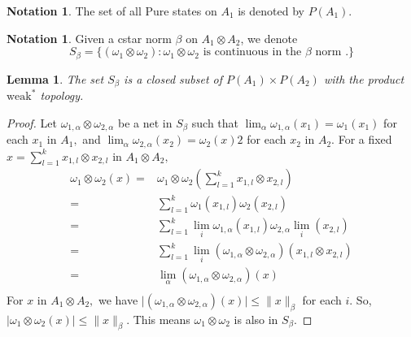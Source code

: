 \documentclass{article}
\theoremstyle{plain}
\newtheorem{lemma}[theorem]{Lemma}
\theoremstyle{definition}
\newtheorem{notation}[theorem]{Notation}
\theoremstyle{remark}
\begin{document}
\begin{notation}
	The set of all Pure states on $A_1$ is denoted by $P(A_1).$
\end{notation}

\begin{notation}
	Given a  cstar norm $\beta$ on $A_1 \otimes A_2$,
	we denote
	$$ S_ \beta = \{ ( \omega_1 \otimes \omega_2) \colon
		\omega_1 \otimes \omega_2 \text{ is continuous in the }
	\beta \text{ norm }. \} $$
\end{notation}

\begin{lemma}
	The set $S_\beta$ is a closed subset of $P(A_1) \times P(A_2)$
	with the product $\text{weak}^\ast$ topology.
\end{lemma}

\begin{proof}
	Let $\omega_{1,\alpha} \otimes \omega_{2,\alpha}$ be a net in $S_\beta$
	such that $\lim_{\alpha} \omega_{1,\alpha} (x_1) = \omega_{1} (x_1)$
	for each $x_1$ in $A_1,$ and $\lim_{\alpha} \omega_{2,\alpha} (x_2)
	= \omega_{2} (x)2$ for each $x_2$ in $A_2.$
	For a fixed $x = \sum_{l=1}^{k} x_{1,l} \otimes x_{2,l}$ in $A_1 \otimes A_2,$ 
\begin{align*}
	\omega_1 \otimes \omega_2 (x)
	={}& \omega_1 \otimes \omega_2 
	(\sum_{l=1}^{k} x_{1,l} \otimes x_{2,l}) \\
	={}& \sum_{l=1}^{k} \omega_1(x_{1,l}) \omega_2(x_{2,l}) \\
	={}& \sum_{l=1}^{k} \lim_i \omega_{1,\alpha} (x_{1,l}) \omega_{2,\alpha} \lim_i (x_{2,l}) \\
	={}& \sum_{l=1}^{k} \lim_i (\omega_{1,\alpha} \otimes \omega_{2,\alpha} )
	(x_{1,l} \otimes x_{2,l}) \\
	={}& \lim_{\alpha} (\omega_{1,\alpha} \otimes \omega_{2,\alpha} ) (x) \\
\end{align*}
For $x$ in $A_1 \otimes A_2,$ we have $\lvert (\omega_{1,\alpha} \otimes \omega_{2,\alpha}) (x) \rvert \leq \lVert x \rVert_{\beta}$ for each $i.$ So, $\lvert \omega_1 \otimes \omega_2 (x) \rvert \leq \lVert x \rVert_{\beta}.$
This means $\omega_1 \otimes \omega_2$ is also in $S_\beta.$
\end{proof}
\end{document}
